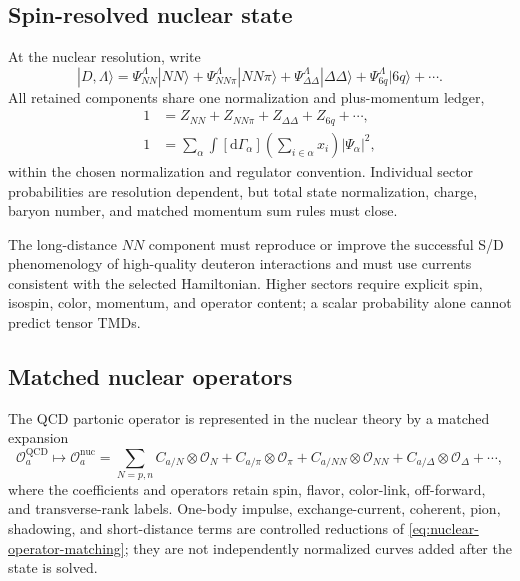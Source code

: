 \documentclass[11pt]{article}
\newcommand{\dd}{\mathrm{d}}
\newcommand{\cO}{\mathcal O}
\begin{document}
\subsection{Spin-resolved nuclear state}

At the nuclear resolution, write
\begin{equation}
 |D,\Lambda\rangle
 =\Psi_{NN}^{\Lambda}|NN\rangle
 +\Psi_{NN\pi}^{\Lambda}|NN\pi\rangle
 +\Psi_{\Delta\Delta}^{\Lambda}|\Delta\Delta\rangle
 +\Psi_{6q}^{\Lambda}|6q\rangle
 +\cdots.
\label{eq:deuteron-sector-expansion}
\end{equation}
All retained components share one normalization and plus-momentum ledger,
\begin{align}
 1&=Z_{NN}+Z_{NN\pi}+Z_{\Delta\Delta}+Z_{6q}+\cdots,
\label{eq:deuteron-probability-ledger}\\
 1&=\sum_\alpha\int[\dd\Gamma_\alpha]
 \left(\sum_{i\in\alpha}x_i\right)
 |\Psi_\alpha|^2,
\label{eq:deuteron-momentum-ledger}
\end{align}
within the chosen normalization and regulator convention.  Individual sector
probabilities are resolution dependent, but total state normalization,
charge, baryon number, and matched momentum sum rules must close.

The long-distance \(NN\) component must reproduce or improve the successful
S/D phenomenology of high-quality deuteron interactions and must use currents
consistent with the selected Hamiltonian.  Higher sectors require explicit
spin, isospin, color, momentum, and operator content; a scalar probability
alone cannot predict tensor TMDs.

\subsection{Matched nuclear operators}

The QCD partonic operator is represented in the nuclear theory by a matched
expansion
\begin{equation}
 \cO_a^{\mathrm{QCD}}
 \longmapsto
 \cO_a^{\mathrm{nuc}}
 =\sum_{N=p,n}C_{a/N}\otimes\cO_N
 +C_{a/\pi}\otimes\cO_\pi
 +C_{a/NN}\otimes\cO_{NN}
 +C_{a/\Delta}\otimes\cO_\Delta
 +\cdots,
\label{eq:nuclear-operator-matching}
\end{equation}
where the coefficients and operators retain spin, flavor, color-link,
off-forward, and transverse-rank labels.  One-body impulse, exchange-current,
coherent, pion, shadowing, and short-distance terms are controlled reductions
of \cref{eq:nuclear-operator-matching}; they are not independently normalized
curves added after the state is solved.
\end{document}
